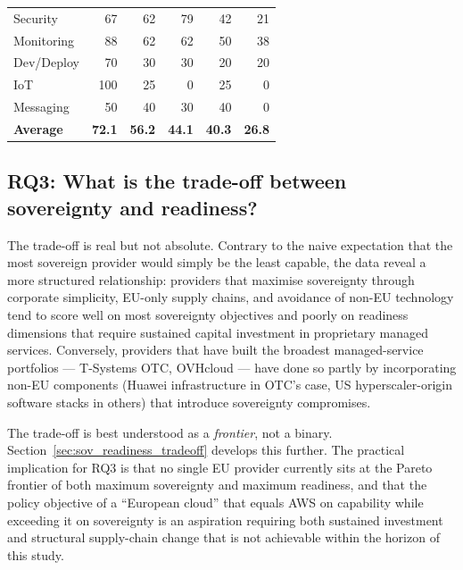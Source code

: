 \begin{table}[htbp]
\begin{tabular}{lrrrrr}
Security       & \cellcolor{green!15}67  & \cellcolor{green!15}62  & \cellcolor{green!15}79  & \cellcolor{yellow!35}42  & \cellcolor{orange!30}21  \\
Monitoring     & \cellcolor{green!35}88  & \cellcolor{green!15}62  & \cellcolor{green!15}62  & \cellcolor{yellow!35}50  & \cellcolor{orange!30}38  \\
Dev/Deploy     & \cellcolor{green!15}70  & \cellcolor{orange!30}30  & \cellcolor{orange!30}30  & \cellcolor{red!35}20    & \cellcolor{red!35}20     \\
IoT            & \cellcolor{green!35}100 & \cellcolor{orange!30}25  & \cellcolor{red!35}0      & \cellcolor{orange!30}25  & \cellcolor{red!35}0      \\
Messaging      & \cellcolor{yellow!35}50  & \cellcolor{orange!30}40  & \cellcolor{orange!30}30  & \cellcolor{orange!30}40  & \cellcolor{red!35}0      \\
\midrule
\textbf{Average} & \cellcolor{green!15}\textbf{72.1} & \cellcolor{yellow!35}\textbf{56.2} & \cellcolor{yellow!35}\textbf{44.1} & \cellcolor{orange!30}\textbf{40.3} & \cellcolor{orange!30}\textbf{26.8} \\
\bottomrule
\end{tabular}
\end{table}

\subsection{RQ3: What is the trade-off between sovereignty and readiness?}

The trade-off is real but not absolute. Contrary to the naive expectation that the most sovereign provider would simply be the least capable, the data reveal a more structured relationship: providers that maximise sovereignty through corporate simplicity, EU-only supply chains, and avoidance of non-EU technology tend to score well on most sovereignty objectives and poorly on readiness dimensions that require sustained capital investment in proprietary managed services. Conversely, providers that have built the broadest managed-service portfolios — T-Systems OTC, OVHcloud — have done so partly by incorporating non-EU components (Huawei infrastructure in OTC's case, US hyperscaler-origin software stacks in others) that introduce sovereignty compromises.

The trade-off is best understood as a \emph{frontier}, not a binary. Section~\ref{sec:sov_readiness_tradeoff} develops this further. The practical implication for RQ3 is that no single EU provider currently sits at the Pareto frontier of both maximum sovereignty and maximum readiness, and that the policy objective of a ``European cloud'' that equals AWS on capability while exceeding it on sovereignty is an aspiration requiring both sustained investment and structural supply-chain change that is not achievable within the horizon of this study.

